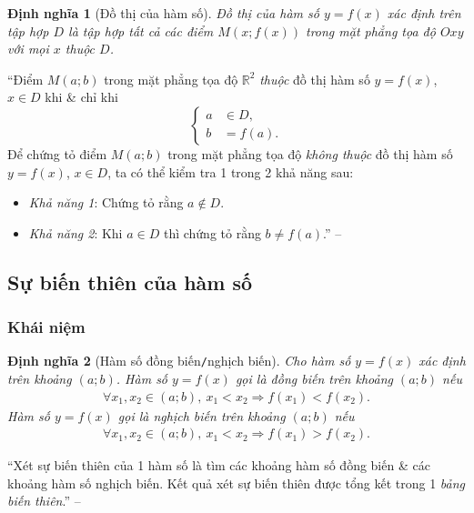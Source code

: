 \documentclass[oneside]{book}
\numberwithin{equation}{section}
\newtheorem{dinhnghia}{Định nghĩa}[section]
\begin{document}
\begin{dinhnghia}[Đồ thị của hàm số]
	\emph{Đồ thị của hàm số} $y = f(x)$ xác định trên tập hợp $D$ là tập hợp tất cả các điểm $M(x;f(x))$ trong mặt phẳng tọa độ $Oxy$ với mọi $x$ thuộc $D$.
\end{dinhnghia}
``Điểm $M(a;b)$ trong mặt phẳng tọa độ $\mathbb{R}^2$ \textit{thuộc} đồ thị hàm số $y = f(x)$, $x\in D$ khi \& chỉ khi
\begin{equation*}
	\left\{\begin{split}
		a&\in D,\\
		b &= f(a).
	\end{split}\right.
\end{equation*}
Để chứng tỏ điểm $M(a;b)$ trong mặt phẳng tọa độ \textit{không thuộc} đồ thị hàm số $y = f(x)$, $x\in D$, ta có thể kiểm tra 1 trong 2 khả năng sau:
\begin{itemize}
	\item \textit{Khả năng 1}: Chứng tỏ rằng $a\notin D$.
	\item \textit{Khả năng 2}: Khi $a\in D$ thì chứng tỏ rằng $b\ne f(a)$.'' -- \cite[pp. 34--35]{SGK_Toan_10_Canh_Dieu_tap_1}
\end{itemize}

\subsection{Sự biến  thiên của hàm số}

\subsubsection{Khái niệm}

\begin{dinhnghia}[Hàm số đồng biến\texttt{/}nghịch biến]
	Cho hàm số $y = f(x)$ xác định trên khoảng $(a;b)$. Hàm số $y = f(x)$ gọi là \emph{đồng biến} trên khoảng $(a;b)$ nếu
	\begin{align*}
		\forall x_1,x_2\in(a;b),\ x_1 < x_2\Rightarrow f(x_1) < f(x_2).
	\end{align*}
	Hàm số $y = f(x)$ gọi là \emph{nghịch biến} trên khoảng $(a;b)$ nếu
	\begin{align*}
		\forall x_1,x_2\in(a;b),\ x_1 < x_2\Rightarrow f(x_1) > f(x_2).
	\end{align*}
\end{dinhnghia}
``Xét sự biến thiên của 1 hàm số là tìm các khoảng hàm số đồng biến \& các khoảng hàm số nghịch biến. Kết quả xét sự biến thiên được tổng kết trong 1 \textit{bảng biến thiên}.'' -- \cite[p. 36]{SGK_Toan_10_Canh_Dieu_tap_1}
\end{document}
